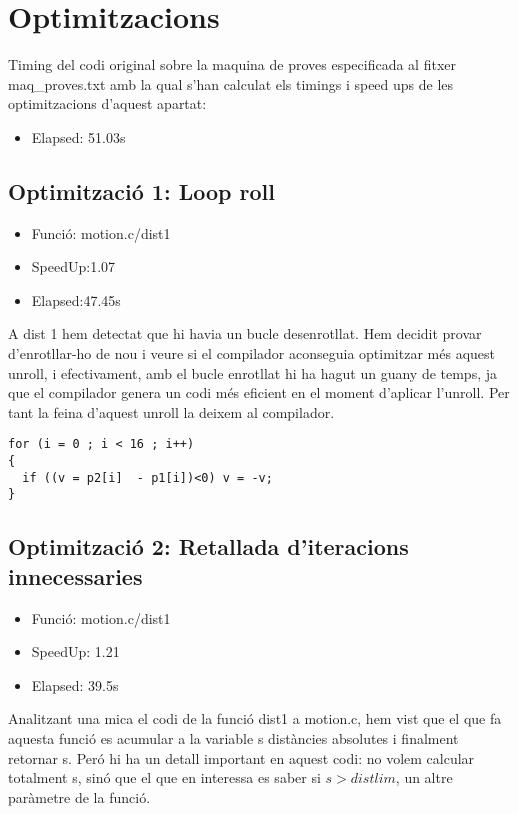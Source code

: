 

\chapter{Optimitzacions}

Timing del codi original sobre la maquina de proves especificada al fitxer maq\_proves.txt amb la qual s'han calculat els timings i speed ups de les optimitzacions d'aquest apartat:
\begin{itemize}
\item{Elapsed: 51.03s}
\end{itemize}


\section{Optimitzaci\'o 1: Loop roll}
\begin{itemize}
\item{Funció: motion.c/dist1}
\item{SpeedUp:1.07}
\item{Elapsed:47.45s}
\end{itemize}

A dist 1 hem detectat que hi havia un bucle desenrotllat. Hem decidit provar d'enrotllar-ho de nou i veure si el compilador aconseguia optimitzar més aquest unroll, i efectivament, amb el bucle enrotllat hi ha hagut un guany de temps, ja que el compilador genera un codi més eficient en el moment d'aplicar l'unroll. Per tant la feina d'aquest unroll la deixem al compilador.

\begin{lstlisting}
for (i = 0 ; i < 16 ; i++)
{
  if ((v = p2[i]  - p1[i])<0) v = -v;
}
\end{lstlisting}
 
\section{Optimitzaci\'o 2: Retallada d'iteracions innecessaries}
\begin{itemize}
\item{Funció: motion.c/dist1}
\item{SpeedUp: 1.21}
\item{Elapsed: 39.5s}
\end{itemize}

Analitzant una mica el codi de la funció dist1 a motion.c, hem vist que el que fa aquesta funció es acumular a la variable s distàncies absolutes i finalment retornar s. Peró hi ha un detall important en aquest codi: no volem calcular totalment s, sinó que el que en interessa es saber si $s>distlim$, un altre paràmetre de la funció.

